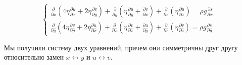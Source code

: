 \begin{equation*}
    \begin{cases}
        \frac
            {\partial}
            {\partial x}
        \left(
            4
            \eta
            \frac
                {\partial u}
                {\partial x}
            +
            2
            \eta
            \frac
                {\partial v}
                {\partial y}
        \right)
        +
        \frac
            {\partial}
            {\partial y}
        \left(
            \eta
            \frac
                {\partial u}
                {\partial y}
            +
            \frac
                {\partial v}
                {\partial x}
        \right)
        +
        \frac
            {\partial}
            {\partial z}
        \left(
            \eta
            \frac
                {\partial u}
                {\partial z}
        \right)
        =
        \rho
        g
        \frac
            {\partial s}
            {\partial x}
    \\
        \frac
            {\partial}
            {\partial y}
        \left(
            4
            \eta
            \frac
                {\partial v}
                {\partial y}
            +
            2
            \eta
            \frac
                {\partial u}
                {\partial x}
        \right)
        +
        \frac
            {\partial}
            {\partial x}
        \left(
            \eta
            \frac
                {\partial v}
                {\partial x}
            +
            \frac
                {\partial u}
                {\partial y}
        \right)
        +
        \frac
            {\partial}
            {\partial z}
        \left(
            \eta
            \frac
                {\partial v}
                {\partial z}
        \right)
        =
        \rho
        g
        \frac
            {\partial s}
            {\partial y}        
    \end{cases}
\end{equation*}

Мы получили систему двух уравнений, причем они симметричны
друг другу относительно замен $x \leftrightarrow y$ и
$u \leftrightarrow v$.

